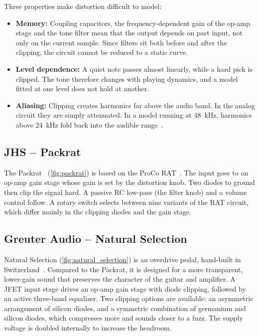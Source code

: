 Three properties make distortion difficult to model:
\begin{itemize}
  \item \textbf{Memory:} Coupling capacitors, the frequency-dependent gain of the op-amp stage and the tone filter mean that the output depends on past input, not only on the current sample. Since filters sit both before and after the clipping, the circuit cannot be reduced to a static curve.
  \item \textbf{Level dependence:} A quiet note passes almost linearly, while a hard pick is clipped. The tone therefore changes with playing dynamics, and a model fitted at one level does not hold at another.
  \item \textbf{Aliasing:} Clipping creates harmonics far above the audio band. In the analog circuit they are simply attenuated. In a model running at \SI{48}{\kilo\hertz}, harmonics above \SI{24}{\kilo\hertz} fold back into the audible range~\cite{parker2016adaa}.
\end{itemize}

\subsection{JHS -- Packrat}
\label{subsec:background_packrat}

The Packrat~\cite{jhs_packrat} (\cref{fig:packrat}) is based on the ProCo RAT~\cite{proco_rat}. The input goes to an op-amp gain stage whose gain is set by the distortion knob. Two diodes to ground then clip the signal hard. A passive RC low-pass (the filter knob) and a volume control follow. A rotary switch selects between nine variants of the RAT circuit, which differ mainly in the clipping diodes and the gain stage.


\subsection{Greuter Audio -- Natural Selection}
\label{subsec:background_natural_selection}

Natural Selection (\cref{fig:natural_selection}) is an overdrive pedal, hand-built in Switzerland~\cite{greuter_natural_selection}. Compared to the Packrat, it is designed for a more transparent, lower-gain sound that preserves the character of the guitar and amplifier. A JFET input stage drives an op-amp gain stage with diode clipping, followed by an active three-band equalizer. Two clipping options are available: an asymmetric arrangement of silicon diodes, and a symmetric combination of germanium and silicon diodes, which compresses more and sounds closer to a fuzz. The supply voltage is doubled internally to increase the headroom.

